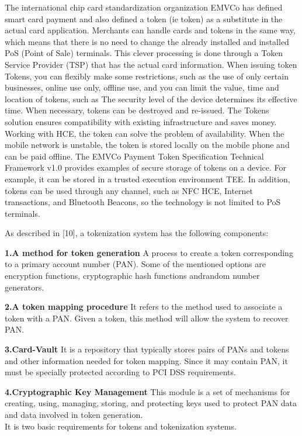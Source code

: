 \documentclass[journal]{IEEEtran}
\begin{document}
  The international chip card standardization organization EMVCo has defined smart card payment and also defined a token (ie token) as a substitute in the actual card application. Merchants can handle cards and tokens in the same way, which means that there is no need to change the already installed and installed PoS (Point of Sale) terminals. This clever processing is done through a Token Service Provider (TSP) that has the actual card information. When issuing token Tokens, you can flexibly make some restrictions, such as the use of only certain businesses, online use only, offline use, and you can limit the value, time and location of tokens, such as The security level of the device determines its effective time. When necessary, tokens can be destroyed and re-issued. The Tokens solution ensures compatibility with existing infrastructure and saves money. Working with HCE, the token can solve the problem of availability. When the mobile network is unstable, the token is stored locally on the mobile phone and can be paid offline. The EMVCo Payment Token Specification Technical Framework v1.0 provides examples of secure storage of tokens on a device. For example, it can be stored in a trusted execution environment TEE. In addition, tokens can be used through any channel, such as NFC HCE, Internet transactions, and Bluetooth Beacons, so the technology is not limited to PoS terminals.
  
As described in [10], a tokenization system has the following components:

\textbf{1.A method for token generation}
A process to create a token corresponding to a primary account number (PAN). Some of the mentioned options are encryption functions, cryptographic hash functions andrandom number generators.

\textbf{2.A token mapping procedure}
It refers to the method used to associate a token with a PAN. Given a token, this method will allow the system to recover PAN.

\textbf{3.Card-Vault}
It is a repository that typically stores pairs of PANs and tokens and other information needed for token mapping. Since it may contain PAN, it must be specially protected according to PCI DSS requirements.

\textbf{4.Cryptographic Key Management}
This module is a set of mechanisms for creating, using, managing, storing, and protecting keys used to protect PAN data and data involved in token generation.
\\

It is two basic requirements for tokens and tokenization systems.
\end{document}
